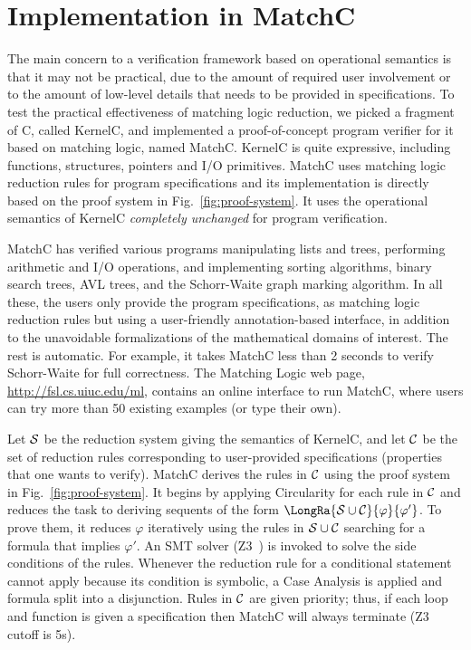 \documentclass{llncs}
\begin{document}
\section{Implementation in MatchC}
\label{sec:implementation}

The main concern to a verification framework based on operational semantics is
that it may not be practical, due to the amount of required user involvement or
to the amount of low-level details that needs to be provided in specifications.
%
To test the practical effectiveness of matching logic reduction, we picked a
fragment of C, called KernelC, and implemented a proof-of-concept program
verifier for it based on matching logic, named MatchC. KernelC is quite
expressive, including functions, structures, pointers and I/O primitives.
MatchC uses matching logic reduction rules for program specifications and its
implementation is directly based on the proof system in
Fig.~\ref{fig:proof-system}. It uses the operational semantics of KernelC {\em
completely unchanged} for program verification.

MatchC has verified various programs manipulating lists and trees, performing
arithmetic and I/O operations, and implementing sorting algorithms, binary
search trees, AVL trees, and the Schorr-Waite graph marking algorithm.  In all
these, the users only provide the program specifications, as matching logic
reduction rules but using a user-friendly annotation-based interface, in
addition to the unavoidable formalizations of the mathematical domains of
interest.  The rest is automatic.  For example, it takes MatchC less than 2
seconds to verify Schorr-Waite for full correctness.  The Matching Logic web
page, \url{http://fsl.cs.uiuc.edu/ml}, contains an online interface to run
MatchC, where users can try more than 50 existing examples (or type their own).

Let ${\cal S}$ be the reduction system giving the semantics of KernelC, and let
${\cal C}$ be the set of reduction rules corresponding to user-provided
specifications (properties that one wants to verify).
%
MatchC derives the rules in ${\cal C}$ using the proof system in
Fig.~\ref{fig:proof-system}.  It begins by applying Circularity for each rule in
${\cal C}$ and reduces the task to deriving sequents of the form $\LongRa{{\cal
S} \cup {\cal C}}{\varphi}{\varphi'}$.
%
To prove them, it reduces $\varphi$ iteratively using the rules in ${\cal S}
\cup {\cal C}$ searching for a formula that implies $\varphi'$.  An SMT solver
(Z3~\cite{DBLP:conf/tacas/MouraB08}) is invoked to solve the side conditions of
the rules.  Whenever the reduction rule for a conditional statement cannot apply
because its condition is symbolic, a Case Analysis is applied and formula split
into a disjunction.  Rules in $\cal C$ are given priority; thus, if each loop
and function is given a specification then MatchC will always terminate (Z3
cutoff is 5s).
\end{document}
